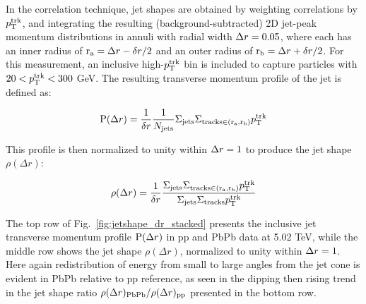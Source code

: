 In the correlation technique, jet shapes are obtained by weighting correlations by $p_{\rm T}^{\rm trk}$, and integrating the resulting (background-subtracted) 2D jet-peak momentum distributions in annuli with radial width $\protect\Delta r = 0.05$, where each has an inner radius of ${\rm r_{a}} = \Delta r - \delta r/2$ and an outer radius of ${\rm r_{b}} = \Delta r + \delta r/2$.  For this measurement, an inclusive high-$p_{\rm T}^{\rm trk}$ bin is included to capture particles with $20 < p_{\rm T}^{\rm trk}< 300 $ GeV.   The resulting transverse momentum profile of the jet is defined as: 

\begin{equation}
{\rm P} (\Delta r) = \frac{1}{\delta r} \frac{1}{N_{\rm jets}} \large{\Sigma_{\rm jets}} \Sigma_{\rm tracks \in (r_{a},r_{b})} p_{\rm T}^{\rm trk}
\end{equation}

\noindent This profile is then normalized to unity within $\protect\Delta r = 1$ to produce the jet shape $\rho(\Delta r)$: 

\begin{equation}
\rho(\Delta r) = \frac{1}{\delta r} \frac{\large{\Sigma_{\rm jets}} \Sigma_{\rm tracks \in (r_{a},r_{b})} p_{\rm T}^{\rm trk}}{\large{\Sigma_{\rm jets}} \Sigma_{\rm tracks} p_{\rm T}^{\rm trk}}
\end{equation}


The top row of Fig.~\ref{fig:jetshape_dr_stacked} presents the inclusive jet transverse momentum profile ${\rm P}(\Delta r)$ in pp and PbPb data at 5.02 TeV, while the middle row shows the jet shape ${\rho}(\Delta r)$, normalized to unity within $\protect\Delta r = 1$.  Here again redistribution of energy from small to large angles from the jet cone is evident in PbPb relative to pp reference, as seen in the dipping then rising trend in the jet shape ratio $\rho(\Delta r)_{\rm PbPb}/\rho(\Delta r)_{\rm pp}$ presented in the bottom row.  

\clearpage

